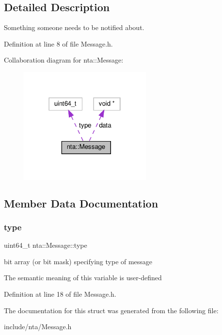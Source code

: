 \subsection{Detailed Description}
Something someone needs to be notified about. 

Definition at line 8 of file Message.\+h.



Collaboration diagram for nta\+:\+:Message\+:\nopagebreak
\begin{figure}[H]
\begin{center}
\leavevmode
\includegraphics[width=190pt]{d3/dbb/structnta_1_1Message__coll__graph}
\end{center}
\end{figure}


\subsection{Member Data Documentation}
\mbox{\label{structnta_1_1Message_a512ef14eaa86f830247f8194cbbd4f83}} 
\subsubsection{\texorpdfstring{type}{type}}
{\footnotesize\ttfamily uint64\+\_\+t nta\+::\+Message\+::type}

bit array (or bit mask) specifying type of message

The semantic meaning of this variable is user-\/defined 

Definition at line 18 of file Message.\+h.



The documentation for this struct was generated from the following file\+:\begin{DoxyCompactItemize}
\item 
include/nta/Message.\+h\end{DoxyCompactItemize}
